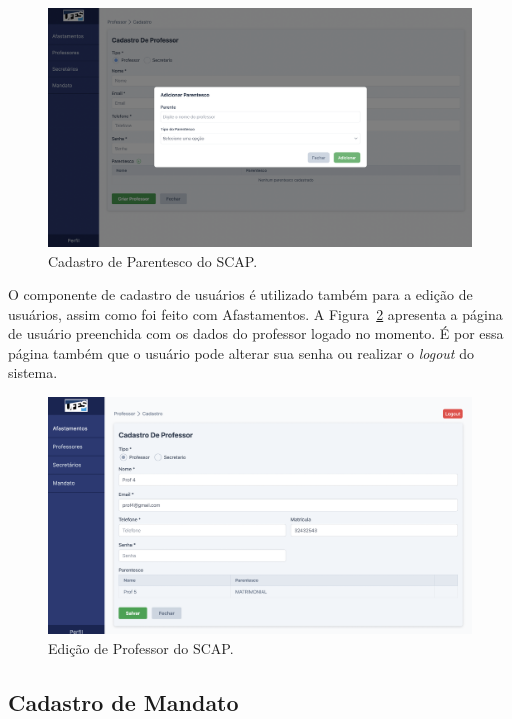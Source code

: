 \begin{figure}[h!]
    \centering
    \includegraphics[width=\textwidth]{figuras/prints-app/fig-modal-parentesco.png}
    \caption{Cadastro de Parentesco do SCAP.}
    \label{fig-parentesco}
\end{figure}


O componente de cadastro de usuários é utilizado também para a edição de usuários, assim como foi feito com Afastamentos. A Figura~\ref{fig-editar-professor}
apresenta a página de usuário preenchida com os dados do professor logado no momento. É por essa página também que o usuário pode alterar sua senha ou realizar o \textit{logout} do sistema.

\begin{figure}[h!]
    \centering
    \includegraphics[width=\textwidth]{figuras/prints-app/fig-perfil.png}
    \caption{Edição de Professor do SCAP.}
    \label{fig-editar-professor}
\end{figure}



\subsection{Cadastro de Mandato}
\label{subsec-projeto-cadastro-mandato}

